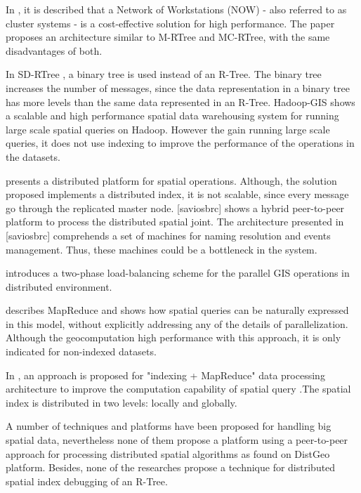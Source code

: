 In \cite{an1999storing}, it is described that a Network of Workstations (NOW) - also referred to as cluster systems  - is a cost-effective solution for high performance. The paper proposes an architecture similar to M-RTree and MC-RTree, with the same disadvantages of both.

In SD-RTree \cite{du2007sd}, a binary tree is used instead of an R-Tree. The binary tree increases the number of messages, since the data representation in a binary tree has more levels than the same data represented in an R-Tree. Hadoop-GIS \cite{kerr2009alternative} shows a scalable and high performance spatial data warehousing system for running large scale spatial queries on Hadoop. However the gain running large scale queries, it does not use indexing to improve the performance of the operations in the datasets.

\cite{dedsi} presents a distributed platform for spatial operations. Although, the solution proposed implements a distributed index, it is not scalable, since every message go through the replicated master node. [saviosbrc] shows a hybrid peer-to-peer platform to process the distributed spatial joint. The architecture presented in [saviosbrc] comprehends a set of machines for naming resolution and events management. Thus, these machines could be a bottleneck in the system.    

\cite{xie2008two} introduces a two-phase load-balancing scheme for the parallel GIS operations in distributed environment.

\cite{zhang2009spatial} describes MapReduce and shows how spatial queries can be naturally expressed in this model, without explicitly addressing any of the details of parallelization. Although the geocomputation high performance with this approach, it is only indicated for non-indexed datasets.

In \cite{zhong2012towards}, an approach is proposed for "indexing + MapReduce" data processing architecture to improve the computation capability of spatial query .The spatial index is distributed in two levels: locally and globally.

A number of techniques and platforms have been proposed for handling big spatial data, nevertheless  none of them propose a platform using a peer-to-peer approach for processing distributed spatial algorithms as found on DistGeo platform. Besides, none of the researches propose a technique for distributed spatial index debugging of an R-Tree.